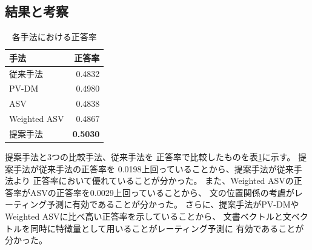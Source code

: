 \documentclass{ttisummary}
\begin{document}


\subsection{結果と考察}

\begin{table}[b!]
  \caption{各手法における正答率}
  \centering
  \begin{tabular}{l | r} \label{tab:Accuracies}
    手法 & 正答率 \\
    \hline
    従来手法\cite{fujitani15}  & 0.4832 \\
    PV-DM & 0.4980 \\
    ASV & 0.4838 \\
    Weighted ASV & 0.4867 \\
    提案手法 & \textbf{0.5030} \\
  \end{tabular}
\end{table}

提案手法と3つの比較手法、従来手法\cite{fujitani15}を
正答率で比較したものを表\ref{tab:Accuracies}に示す。
提案手法が従来手法\cite{fujitani15}の正答率を
0.0198上回っていることから、提案手法が従来手法\cite{fujitani15}より
正答率において優れていることが分かった。
また、Weighted ASVの正答率がASVの正答率を0.0029上回っていることから、
文の位置関係の考慮がレーティング予測に有効であることが分かった。
さらに、提案手法がPV-DMやWeighted ASVに比べ高い正答率を示していることから、
文書ベクトルと文ベクトルを同時に特徴量として用いることがレーティング予測に
有効であることが分かった。
\end{document}
